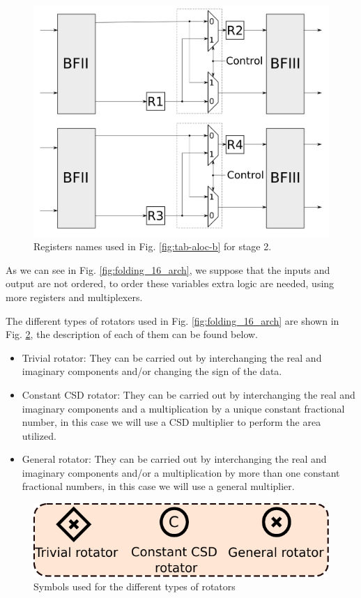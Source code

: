 \documentclass[journal,comsoc]{IEEEtran}
\begin{document}
    \begin{figure} 
        \centering
        \includegraphics[width= 0.85\linewidth]{Diagramas/folding_stage2.png}
        \caption{Registers names used in Fig. \ref{fig:tab-aloc-b} for stage 2.}
        \label{fig:folding16_stage2}
    \end{figure}        


As we can see in Fig. \ref{fig:folding_16_arch}, we suppose that the inputs and output are not ordered, to order these variables extra logic are needed, using more registers and multiplexers.

The different types of rotators used in Fig. \ref{fig:folding_16_arch} are shown in Fig. \ref{fig:rotators}, the description of each of them can be found below.
\begin{itemize}
	\item Trivial rotator: They can be carried out by interchanging the real and imaginary components and/or changing the sign of the data.
	\item Constant CSD rotator: They can be carried out by interchanging the real and imaginary components and a multiplication by a unique constant fractional number, in this case we will use a CSD multiplier to perform the area utilized.
	\item General rotator: They can be carried out by interchanging the real and imaginary components and/or a multiplication by more than one constant fractional numbers, in this case we will use a general multiplier.
\end{itemize}

\begin{figure} 
	\centering
	\includegraphics[width=0.6\linewidth]{Diagramas/miSeccionFiguras/Rotadores.pdf}
	\caption{Symbols used for the different types of rotators}
	\label{fig:rotators}
\end{figure}
\end{document}
